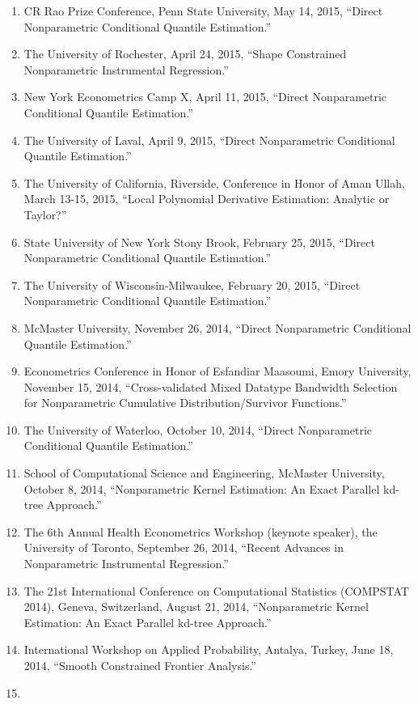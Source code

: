 \documentclass[
]{article}
\begin{document}
\begin{enumerate}
\item
  CR Rao Prize Conference, Penn State University, May 14, 2015, ``Direct
  Nonparametric Conditional Quantile Estimation.''
\item
  The University of Rochester, April 24, 2015, ``Shape Constrained
  Nonparametric Instrumental Regression.''
\item
  New York Econometrics Camp X, April 11, 2015, ``Direct Nonparametric
  Conditional Quantile Estimation.''
\item
  The University of Laval, April 9, 2015, ``Direct Nonparametric
  Conditional Quantile Estimation.''
\item
  The University of California, Riverside, Conference in Honor of Aman
  Ullah, March 13-15, 2015, ``Local Polynomial Derivative Estimation:
  Analytic or Taylor?''
\item
  State University of New York Stony Brook, February 25, 2015, ``Direct
  Nonparametric Conditional Quantile Estimation.''
\item
  The University of Wisconsin-Milwaukee, February 20, 2015, ``Direct
  Nonparametric Conditional Quantile Estimation.''
\item
  McMaster University, November 26, 2014, ``Direct Nonparametric
  Conditional Quantile Estimation.''
\item
  Econometrics Conference in Honor of Esfandiar Maasoumi, Emory
  University, November 15, 2014, ``Cross-validated Mixed Datatype
  Bandwidth Selection for Nonparametric Cumulative Distribution/Survivor
  Functions.''
\item
  The University of Waterloo, October 10, 2014, ``Direct Nonparametric
  Conditional Quantile Estimation.''
\item
  School of Computational Science and Engineering, McMaster University,
  October 8, 2014, ``Nonparametric Kernel Estimation: An Exact Parallel
  kd-tree Approach.''
\item
  The 6th Annual Health Econometrics Workshop (keynote speaker), the
  University of Toronto, September 26, 2014, ``Recent Advances in
  Nonparametric Instrumental Regression.''
\item
  The 21st International Conference on Computational Statistics
  (COMPSTAT 2014), Geneva, Switzerland, August 21, 2014, ``Nonparametric
  Kernel Estimation: An Exact Parallel kd-tree Approach.''
\item
  International Workshop on Applied Probability, Antalya, Turkey, June
  18, 2014, ``Smooth Constrained Frontier Analysis.''
\item

\end{enumerate}
\end{document}

